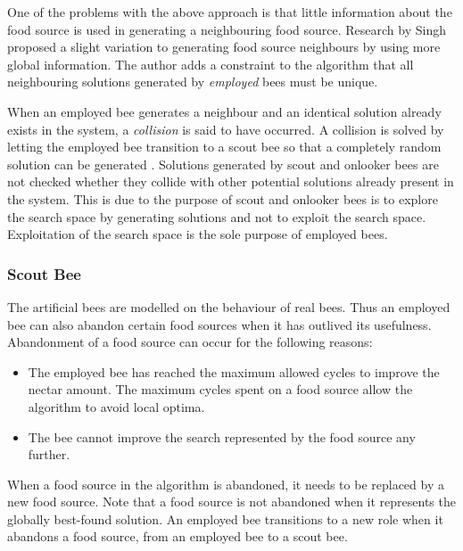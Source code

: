 One of the problems with the above approach is that little information about the food source is used in generating a neighbouring food source. Research by Singh \cite{ABCLeafConstrained} proposed a slight variation to generating food source neighbours by using more global information. The author adds a constraint to the algorithm that all neighbouring solutions generated by \emph{employed} bees must be unique. 

When an employed bee generates a neighbour and an identical solution already exists in the system, a \emph{collision} is said to have occurred. A collision is solved by letting the employed bee transition to a scout bee so that a completely random solution can be generated \cite{ABCLeafConstrained}. Solutions generated by scout and onlooker bees are not checked whether they collide with other potential solutions already present in the system\cite{BeeJobShop,ABCCompareStudy}. This is due to the purpose of scout and onlooker bees is to explore the search space by generating solutions and not to exploit the search space\cite{BeeJobShop,ABCCompareStudy}. Exploitation of the search space is the sole purpose of employed bees\cite{BeeJobShop,ABCCompareStudy}. 
\subsubsection{Scout Bee}
The artificial bees are modelled on the behaviour of real bees. Thus an employed bee can also abandon certain food sources when it has outlived its usefulness. Abandonment of a food source can occur for the following reasons\cite{BeeJobShop,ABCNumericalOptimization,ABCImageEnhancement}:
\begin{itemize}
\item The employed bee has reached the maximum allowed cycles to improve the nectar amount. The maximum cycles spent on a food source allow the algorithm to avoid local optima\cite{ABCCompareStudy,ABCNumericalOptimization,ABCImageEnhancement}.
\item The bee cannot improve the search represented by the food source any further\cite{ABCCompareStudy,ABCNumericalOptimization,ABCImageEnhancement}.
\end{itemize}
When a food source in the algorithm is abandoned, it needs to be replaced by a new food source\cite{BeeJobShop,ABCCompareStudy,ABCImageEnhancement}. Note that a food source is not abandoned when it represents the globally best-found solution. An employed bee transitions to a new role when it abandons a food source, from an employed bee to a scout bee\cite{ABCCompareStudy,ABCNumericalOptimization,ABCImageEnhancement}. 

